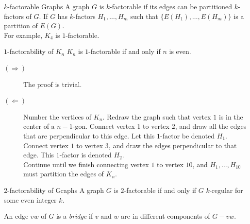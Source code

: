 \documentclass[10pt]{extarticle}
\begin{document}
{\begin{problem}{$k$-factorable Graphs}
    A graph $G$ is $k$-factorable if its edges can be partitioned $k$-factors of $G$. If $G$ has $k$-factors $H_1,\dots,H_m$ such that $\{E(H_1),\dots,E(H_m)\}$ is a partition of $E(G)$.\\

    For example, $K_4$ is $1$-factorable.
    \begin{center}
    \end{center}
    \begin{problem}{$1$-factorability of $K_n$}
      $K_n$ is $1$-factorable if and only if $n$ is even.
      \tcblower
      \begin{description}
        \item[$(\Rightarrow)$] The proof is trivial.
        \item[$(\Leftarrow)$] Number the vertices of $K_n$. Redraw the graph such that vertex $1$ is in the center of a $n-1$-gon. Connect vertex $1$ to vertex $2$, and draw all the edges that are perpendicular to this edge. Let this $1$-factor be denoted $H_1$.\\

          Connect vertex $1$ to vertex $3$, and draw the edges perpendicular to that edge. This $1$-factor is denoted $H_2$.\\

          Continue until we finish connecting vertex $1$ to vertex $10$, and $H_1,\dots,H_{10}$ must partition the edges of $K_n$.
      \end{description}
    \end{problem}
    \begin{problem}{$2$-factorability of Graphs}
      A graph $G$ is $2$-factorable if and only if $G$ $k$-regular for some even integer $k$.
    \end{problem}
    An edge $vw$ of $G$ is a \textit{bridge} if $v$ and $w$ are in different components of $G-vw$.
  \end{problem}
}
\end{document}
